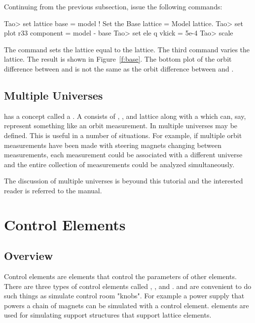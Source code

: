 \documentclass{hitec}
\newcommand{\Section}[1]{\section{#1}\vspace*{-1ex}}
\begin{document}
Continuing from the previous subsection, issue the following commands:
\begin{code}
Tao> set lattice base = model  ! Set the Base lattice = Model lattice.
Tao> set plot r33 component = model - base
Tao> set ele q vkick = 5e-4
Tao> scale
\end{code} 
The  command sets the  lattice equal to the 
lattice. The third command varies the  lattice.  The result is shown in
Figure~\ref{f:base}. The bottom plot of the orbit difference between  and
 is not the same as the orbit difference between  and .

\subsection{Multiple Universes}

\tao has a concept called a . A  consists of , ,
and  lattice along with a  which can, say, represent something like
an orbit measurement. In \tao multiple universes may be defined. This is useful in a number of 
situations. For example, if multiple orbit measurements have been made with steering magnets
changing between measurements, each measurement could be associated with a different universe
and the entire collection of measurements could be analyzed simultaneously. 

The discussion of multiple universes is beyound this tutorial and the interested reader is 
referred to the \tao manual.


\Section{Control Elements}

\subsection{Overview}

Control elements are elements that control the parameters of other elements. There are three types
of control elements called , , and .  and
 are convenient to do such things as simulate control room "knobs". For example a power
supply that powers a chain of magnets can be simulated with a control element.
 elements are used for simulating support structures that support lattice elements.
\end{document}
